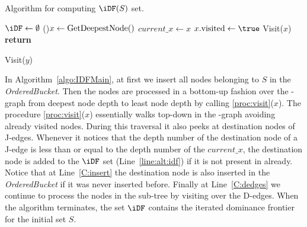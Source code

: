 {\begin{algorithm}
  \caption{Algorithm for computing $\iDF(S)$ set.}
  \label{algo:IDFMain}


  $\iDF \gets \emptyset$\;
  \While(){$x \gets \textrm{GetDeepestNode}()$}{  \label{C:get} 
    $\textit{current\_x} \gets x$\;
    $x.\visited \gets \true$\;
    Visit($x$)
  }
  \textbf{return} \iDF
\end{algorithm}

\begin{procedure}
  \caption{Visit($y$)}
  \label{proc:visit}
\end{procedure}

In Algorithm~\ref{algo:IDFMain}, at first we insert all nodes belonging to $S$ in the \textit{OrderedBucket}. 
Then the nodes are processed in a bottom-up fashion over the \DJ-graph from deepest node depth to least node depth by calling \ref{proc:visit}($x$). 
The procedure \ref{proc:visit}($x$) essentially walks top-down in the \DJ-graph avoiding already visited nodes. 
During this traversal it also peeks at destination nodes of J-edges.  Whenever 
it notices that the depth number of the destination node of a J-edge is less 
than or equal to the depth number of the $\textit{current\_x}$, the destination 
node is added to the $\iDF$ set (Line~\ref{line:alt:idf}) if it is not present 
in \iDF already.  Notice that at Line~\ref{C:insert} the destination node is 
also inserted in the {\it OrderedBucket} if it was never inserted before.  
Finally at Line~\ref{C:dedges} we continue to process the nodes in the sub-tree 
by visiting over the D-edges.  When the algorithm terminates, the set $\iDF$ 
contains the iterated dominance frontier for the initial set $S$.

}
